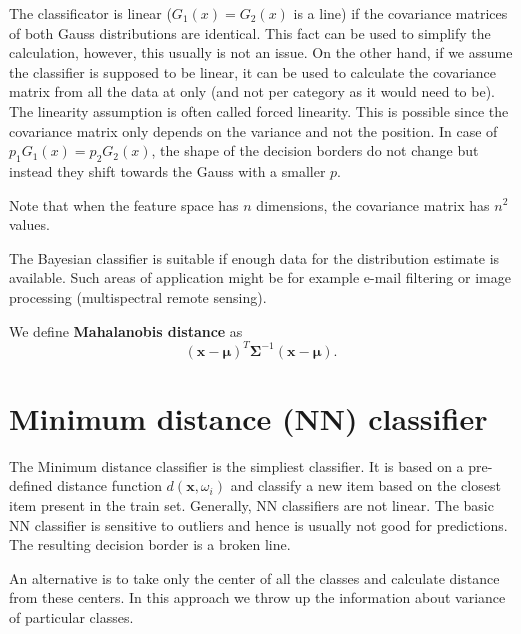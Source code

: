 \begin{remark}
The classificator is linear ($G_1(x)=G_2(x)$ is a line) if the covariance matrices of both Gauss distributions are identical. This fact can be used to simplify the calculation, however, this usually is not an issue. On the other hand, if we assume the classifier is supposed to be linear, it can be used to calculate the covariance matrix from all the data at only (and not per category as it would need to be). The linearity assumption is often called forced linearity. This is possible since the covariance matrix only depends on the variance and not the position. In case of $p_1G_1(x)=p_2G_2(x)$, the shape of the decision borders do not change but instead they shift towards the Gauss with a smaller $p$.
\end{remark}

\begin{remark}
Note that when the feature space has $n$ dimensions, the covariance matrix has $n^2$ values.
\end{remark}

\begin{remark}
	The Bayesian classifier is suitable if enough data for the distribution estimate is available. Such areas of application might be for example e-mail filtering or image processing (multispectral remote sensing).
\end{remark}

\begin{define}
We define \textbf{Mahalanobis distance} as $$ (\textbf{x}-\boldsymbol{\mu})^T\boldsymbol{\Sigma}^{-1}(\textbf{x}-\boldsymbol{\mu}). $$
\end{define}

\section{Minimum distance (NN) classifier}
The Minimum distance classifier is the simpliest classifier. It is based on a pre-defined distance function $d(\textbf{x},\omega_i)$ and classify a new item based on the closest item present in the train set. Generally, NN classifiers are not linear. The basic NN classifier is sensitive to outliers and hence is usually not good for predictions. The resulting decision border is a broken line.

An alternative is to take only the center of all the classes and calculate distance from these centers. In this approach we throw up the information about variance of particular classes.


